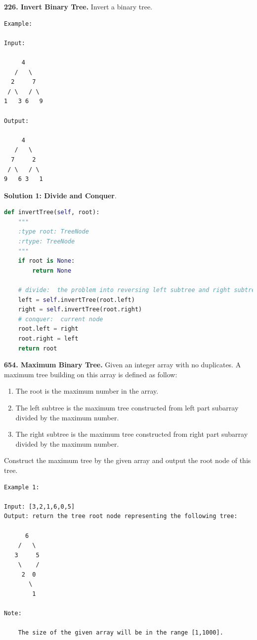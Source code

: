 \documentclass[../main.tex]{subfiles}
\begin{document}
\begin{examples}[resume]
\item \textbf{226. Invert Binary Tree.} Invert a binary tree.
\begin{lstlisting}[numbers=none]
Example:

Input:

     4
   /   \
  2     7
 / \   / \
1   3 6   9

Output:

     4
   /   \
  7     2
 / \   / \
9   6 3   1
\end{lstlisting}
\textbf{Solution 1: Divide and Conquer}.
\begin{lstlisting}[language=Python]
def invertTree(self, root):
    """
    :type root: TreeNode
    :rtype: TreeNode
    """
    if root is None:
        return None
    
    # divide:  the problem into reversing left subtree and right subtree
    left = self.invertTree(root.left)
    right = self.invertTree(root.right)
    # conquer:  current node
    root.left = right
    root.right = left
    return root
\end{lstlisting}

\item \textbf{654. Maximum Binary Tree.} Given an integer array with no duplicates. A maximum tree building on this array is defined as follow:
 \begin{enumerate}
    \item The root is the maximum number in the array.
    \item The left subtree is the maximum tree constructed from left part subarray divided by the maximum number.
    \item The right subtree is the maximum tree constructed from right part subarray divided by the maximum number.
 \end{enumerate}

Construct the maximum tree by the given array and output the root node of this tree.
\begin{lstlisting}[numbers=none]
Example 1:

Input: [3,2,1,6,0,5]
Output: return the tree root node representing the following tree:

      6
    /   \
   3     5
    \    / 
     2  0   
       \
        1

Note:

    The size of the given array will be in the range [1,1000].


\end{lstlisting}
\end{examples}
\end{document}
